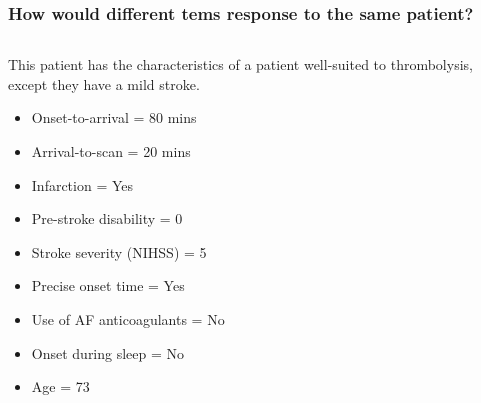 \documentclass{beamer}
\begin{document}
\begin{frame}
\frametitle{How would different tems response to the same patient?}

\begin{columns}%

    \begin{column}{0.45\textwidth}

        \begin{footnotesize}
    
        This patient has the characteristics of a patient well-suited to thrombolysis, except they have a mild stroke.

        \vspace{3mm}
        

        \begin{itemize}
            \item Onset-to-arrival = 80 mins
            \item Arrival-to-scan = 20 mins
            \item Infarction = Yes
            \item Pre-stroke disability = 0
            \item Stroke severity (NIHSS) = 5
            \item Precise onset time = Yes
            \item Use of AF anticoagulants = No
            \item Onset during sleep = No
            \item Age = 73
        \end{itemize}
        \end{footnotesize}
        
    \end{column}
    

\end{columns}
\end{frame}
\end{document}
